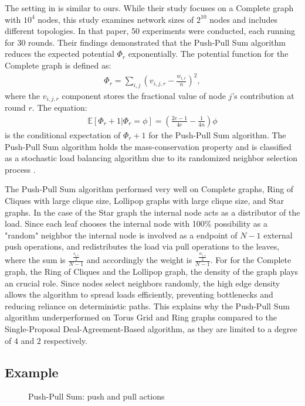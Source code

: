 

The setting in \cite{nugroho2023PushPullSumDataAg} is similar to ours. While their study focuses on a Complete graph with $10^{4}$ nodes, this study examines network sizes of $2^{10}$ nodes and includes different topologies. In that paper, 50 experiments were conducted, each running for 30 rounds. Their findings demonstrated that the Push-Pull Sum algorithm reduces the expected potential $\Phi_r$ exponentially. The potential function for the Complete graph is defined as:
\begin{align}
    \Phi_r=\sum_{i,j}\left(v_{i,j,r}-\frac{w_{i,r}}{n}\right)^{2},  
\end{align} where the $v_{i,j,r}$ component stores the fractional value of node $j$'s contribution at round $r$. The equation: 
\begin{align}
    \mathbb{E}[\Phi_r+1|\Phi_r=\phi]=(\frac{2e-1}{4e}-\frac{1}{4n})\phi    
\end{align}
is the conditional expectation of $\Phi_r+1$ for the Push-Pull Sum algorithm. The Push-Pull Sum algorithm holds the mass-conservation property and is classified as a stochastic load balancing algorithm due to its randomized neighbor selection process \cite{nugroho2023PushPullSumDataAg}.

The Push-Pull Sum algorithm performed very well on Complete graphs, Ring of Cliques with large clique size, Lollipop graphs with large clique size, and Star graphs. In the case of the Star graph the internal node acts as a distributor of the load. Since each leaf chooses the internal node with 100\% possibility as a "random" neighbor the internal node is involved as a endpoint of $N-1$ external push operations, and redistributes the load via pull operations to the leaves, where the sum is $\frac{\frac{s_{i,r}}{2}}{N-1}$ and accordingly the weight is $\frac{\frac{w_{i,r}}{2}}{N-1}$. For for the Complete graph, the Ring of Cliques and the Lollipop graph, the density of the graph plays an crucial role. Since nodes select neighbors randomly, the high edge density allows the algorithm to spread loads efficiently, preventing bottlenecks and reducing reliance on deterministic paths.  This explains why the Push-Pull Sum algorithm underperformed on Torus Grid and Ring graphs compared to the Single-Proposal Deal-Agreement-Based algorithm, as they are limited to a degree of $4$ and $2$ respectively.

\subsection{Example}\label{subsec:examplePPS}
\begin{figure}
    \centering
    \scalebox{0.75}{}
    \caption{Push-Pull Sum: push and pull actions}
    \label{fig:examplePPSSetting}
\end{figure}


